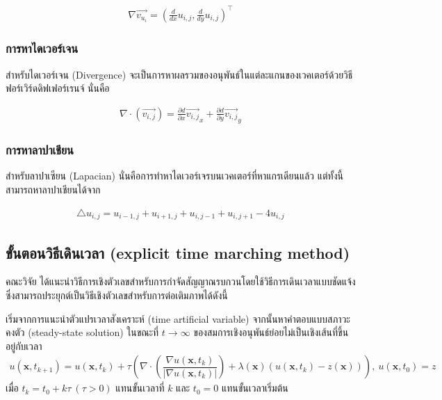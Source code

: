 \begin{align*}
	\nabla \vec{v_{u_i}} = (\frac{d}{dx} u_{i,j},\frac{d}{dy} u_{i,j})^{\top}	
\end{align*}

\subsubsection{การหาไดเวอร์เจน}
\noindent\hspace{1cm}สำหรับไดเวอร์เจน (Divergence) จะเป็นการหาผลรวมของอนุพันธ์ในแต่ละแกนของเวคเตอร์ด้วยวิธีฟอร์เวิร์ดดิฟเฟอร์เรนจ์ นั่นคือ 

\begin{align*} 
	\nabla \cdot (\vec{v_{i,j}}) = \frac{\partial d}{\partial x}\vec{v_{i,j}}_x + \frac{\partial d}{\partial y}\vec{v_{i,j}}_y
\end{align*}

\subsubsection{การหาลาปาเชียน}
\noindent\hspace{1cm}สำหรับลาปาเซียน (Lapacian) นั่นคือการทำหาไดเวอร์เจรบนเวคเตอร์ที่หาแกรเดียนแล้ว แต่ทั้งนี้สามารถหาลาปาเชียนได้จาก

\begin{align*}
	\triangle u_{i,j} = u_{i-1,j} + u_{i+1,j} + u_{i,j-1} + u_{i,j+1} - 4 u_{i,j} 
\end{align*}

\subsection{ขั้นตอนวิธีเดินเวลา (explicit time marching method)}

\hspace{1cm} คณะวิจัย \cite{ref:ROF-template} ได้แนะนำวิธีการเชิงตัวเลขสำหรับการกำจัดสัญญาณรบกวนโดยใช้วิธีการเดินเวลาแบบชัดแจ้ง ซึ่งสามารถประยุกต์เป็นวิธีเชิงตัวเลขสำหรับการต่อเติมภาพได้ดังนี้
	
\hspace{1cm} เริ่มจากการแนะนําตัวแปรเวลาสังเคราะห์ (time artificial variable) จากนั้นหาคําตอบแบบสภาวะคงตัว (steady-state solution) ในขณะที่ $t\rightarrow \infty$ ของสมการเชิงอนุพันธ์ย่อยไม่เป็นเชิงเส้นที่ขึ้นอยู่กับเวลา 
\begin{align}
	u(\mathbf{x},t_{k+1})=u(\mathbf{x},t_{k})+\tau\left(\nabla \cdot\left(\dfrac{\nabla u (\mathbf{x},t_k)}{| \nabla u (\mathbf{x},t_k) | }\right) + \lambda(\mathbf{x})(u (\mathbf{x},t_k)-z(\mathbf{x})) \right),\ u(\mathbf{x},t_0)=z
	\label{e4}
\end{align}
เมื่อ $t_k=t_0+k\tau\ (\tau>0)$  แทนขั้นเวลาที่ $k$ และ $t_0=0$ แทนขั้นเวลาเริ่มต้น
	
